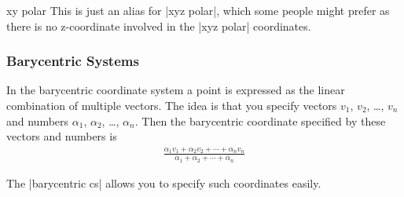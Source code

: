 \begin{coordinatesystem}{xy polar}
  This is just an alias for |xyz polar|, which some people might
  prefer as there is no z-coordinate involved in the |xyz polar|
  coordinates.
\end{coordinatesystem}


\subsubsection{Barycentric Systems}
\label{section-barycentric-coordinates}

In the barycentric coordinate system a point is expressed as the
linear combination of multiple vectors. The idea is that you specify
vectors $v_1$, $v_2$, \dots, $v_n$ and numbers $\alpha_1$, $\alpha_2$,
\dots, $\alpha_n$. Then the barycentric coordinate specified by these
vectors and numbers is
\begin{align*}
  \frac{\alpha_1 v_1 + \alpha_2 v_2 + \cdots + \alpha_n v_n}{\alpha_1
    + \alpha_2 + \cdots + \alpha_n}
\end{align*}

The |barycentric cs| allows you to specify such coordinates easily.

